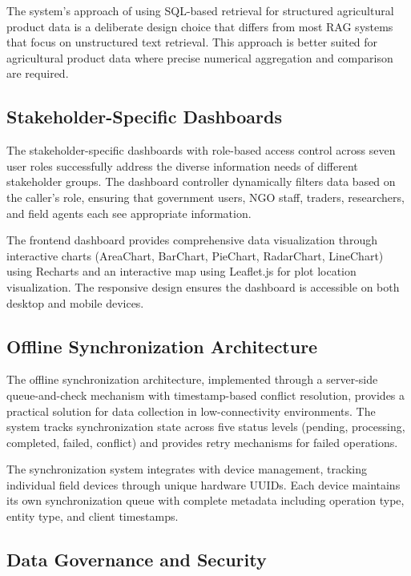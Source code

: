 The system's approach of using SQL-based retrieval for structured agricultural product data is a deliberate design choice that differs from most RAG systems that focus on unstructured text retrieval. This approach is better suited for agricultural product data where precise numerical aggregation and comparison are required.

\subsection{Stakeholder-Specific Dashboards}

The stakeholder-specific dashboards with role-based access control across seven user roles successfully address the diverse information needs of different stakeholder groups. The dashboard controller dynamically filters data based on the caller's role, ensuring that government users, NGO staff, traders, researchers, and field agents each see appropriate information.

The frontend dashboard provides comprehensive data visualization through interactive charts (AreaChart, BarChart, PieChart, RadarChart, LineChart) using Recharts and an interactive map using Leaflet.js for plot location visualization. The responsive design ensures the dashboard is accessible on both desktop and mobile devices.

\subsection{Offline Synchronization Architecture}

The offline synchronization architecture, implemented through a server-side queue-and-check mechanism with timestamp-based conflict resolution, provides a practical solution for data collection in low-connectivity environments. The system tracks synchronization state across five status levels (pending, processing, completed, failed, conflict) and provides retry mechanisms for failed operations.

The synchronization system integrates with device management, tracking individual field devices through unique hardware UUIDs. Each device maintains its own synchronization queue with complete metadata including operation type, entity type, and client timestamps.

\subsection{Data Governance and Security}

